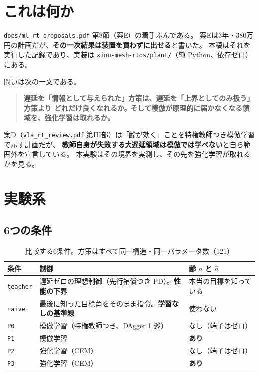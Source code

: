 \documentclass[11pt,a4paper]{article}
\newcommand{\code}[1]{\texttt{#1}}
\newcommand{\prob}[1]{\textbf{\textcolor{red!55!black}{#1}}}
\newcommand{\keyp}[1]{\textbf{\textcolor{blue!45!black}{#1}}}
\begin{document}
\vspace{-2mm}
{\small\tableofcontents}

\section{これは何か}

\code{docs/ml\_rt\_proposals.pdf} 第8節（案E）の着手ぶんである。
案Eは3年・380万円の計画だが、\keyp{その一次結果は装置を買わずに出せる}と書いた。
本稿はそれを実行した記録であり、実装は \code{xinu-mesh-rtos/planE/}（純 Python、依存ゼロ）にある。

問いは次の一文である。

\begin{quote}
\keyp{遅延を「情報として与えられた」方策は、遅延を「上界としてのみ扱う」方策より
どれだけ良くなれるか。そして模倣が原理的に届かなくなる領域を、強化学習は取れるか。}
\end{quote}

案D（\code{vla\_rt\_review.pdf} 第III部）は「齢が効く」ことを特権教師つき模倣学習で示す計画だが、
\prob{教師自身が失敗する大遅延領域は模倣では学べない}と自ら範囲外を宣言している。
本実験はその境界を実測し、その先を強化学習が取れるかを見る。

\section{実験系}

\subsection{6つの条件}

\begin{table}[htbp]
\centering
\small
\caption{比較する6条件。方策はすべて同一構造・同一パラメータ数（121）}
\begin{tabularx}{\textwidth}{@{}l X l@{}}
\toprule
\textbf{条件} & \textbf{制御} & \textbf{齢 $a$ と $\hat a$} \\
\midrule
\code{teacher} & 遅延ゼロの理想制御（先行補償つき PD）。\keyp{性能の下界} & 本当の目標を知っている \\
\code{naive}   & 最後に知った目標角をそのまま指令。\keyp{学習なしの基準線} & 使わない \\
\code{P0} & 模倣学習（特権教師つき、DAgger 1 巡） & なし（端子はゼロ） \\
\code{P1} & 模倣学習 & \keyp{あり} \\
\code{P2} & 強化学習（CEM） & なし（端子はゼロ） \\
\code{P3} & 強化学習（CEM） & \keyp{あり} \\
\bottomrule
\end{tabularx}
\end{table}
\end{document}
